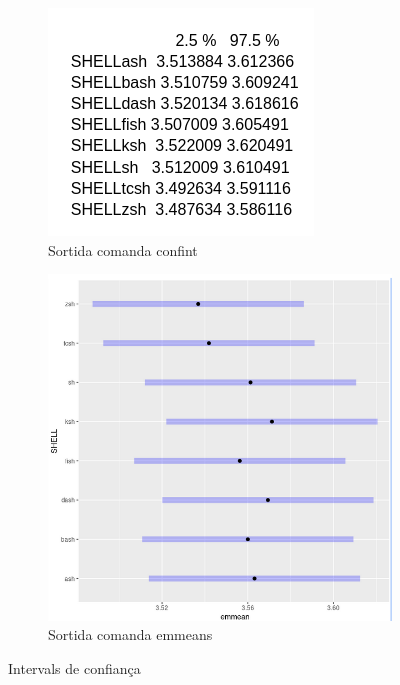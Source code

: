 \documentclass[12pt]{article}
\begin{document}
\begin{figure}[h!]
  \centering
  \begin{subfigure}[b]{0.45\linewidth}
      \includegraphics[width=\linewidth]{conf1.png}
      \caption{Sortida comanda confint}
      \label{fig:conf1}
  \end{subfigure}
  \begin{subfigure}[b]{0.45\linewidth}
    \includegraphics[width=\linewidth]{conf1i.png}
    \caption{Sortida comanda emmeans}
    \label{fig:conf1i}
  \end{subfigure}
  \caption{Intervals de confiança}
  \label{fig:ic1}
\end{figure}
\end{document}
